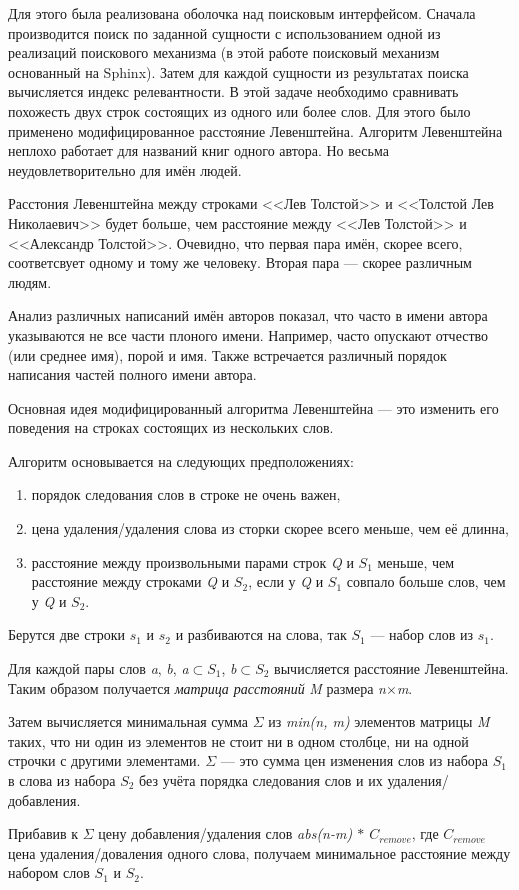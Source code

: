 Для этого была реализована оболочка над поисковым интерфейсом.
Сначала производится поиск по заданной сущности с использованием одной из реализаций поискового механизма (в этой работе поисковый механизм основанный на Sphinx). Затем для каждой сущности из результатах поиска вычисляется индекс релевантности.
В этой задаче необходимо сравнивать похожесть двух строк состоящих из одного или более слов.
Для этого было применено модифицированное расстояние Левенштейна.
Алгоритм Левенштейна \cite{distance} неплохо работает для названий книг одного автора.
Но весьма неудовлетворительно для имён людей.

Расстония Левенштейна между строками <<Лев Толстой>> и <<Толстой Лев Николаевич>> будет больше, 
чем расстояние между <<Лев Толстой>> и <<Александр Толстой>>.
Очевидно, что первая пара имён, скорее всего, соответсвует одному и тому же человеку. Вторая пара --- скорее различным людям.

Анализ различных написаний имён авторов показал, что часто в имени автора указываются не все части плоного имени.
Например, часто опускают отчество (или среднее имя), порой и имя.
Также встречается различный порядок написания частей полного имени автора.

Основная идея модифицированный алгоритма Левенштейна --- это изменить его поведения на строках состоящих из нескольких слов.

Алгоритм основывается на следующих предположениях:
\begin{enumerate}
	\item порядок следования слов в строке не очень важен,
	\item цена удаления/удаления слова из сторки скорее всего меньше, чем её длинна,
	\item расстояние между произвольными парами строк \textit{Q} и \textit{$S_{1}$} меньше, 
	  	  чем расстояние между строками \textit{Q} и \textit{$S_{2}$},
		  если у \textit{Q} и \textit{$S_{1}$} совпало больше слов, чем у \textit{Q} и \textit{$S_{2}$}.
\end{enumerate}


{
Берутся две строки \textit{$s_{1}$} и \textit{$s_{2}$} и разбиваются на слова, так \textit{$S_{1}$} --- набор слов из \textit{$s_{1}$}.

Для каждой пары слов \textit{a}, \textit{b}, \textit{a}$\subset$\textit{$S_{1}$}, \textit{b}$\subset$\textit{$S_{2}$} вычисляется  расстояние Левенштейна.
Таким образом получается {\em матрица расстояний} \textit{M} размера \textit{n}$\times$\textit{m}.

Затем вычисляется минимальная сумма $\Sigma$ из \textit{min(n, m)} элементов матрицы \textit{M} таких,
что ни один из элементов не стоит ни в одном столбце, ни на одной строчки с другими элементами.
$\Sigma$ --- это сумма цен изменения слов из набора \textit{$S_{1}$} в слова из набора \textit{$S_{2}$} без учёта порядка следования слов
и их удаления/добавления.

Прибавив к $\Sigma$ цену добавления/удаления слов \textit{abs(n-m) $\ast$ $C_{remove}$}, где \textit{$C_{remove}$} цена удаления/доваления одного слова, получаем минимальное расстояние между набором слов \textit{$S_{1}$} и \textit{$S_{2}$}.
}


